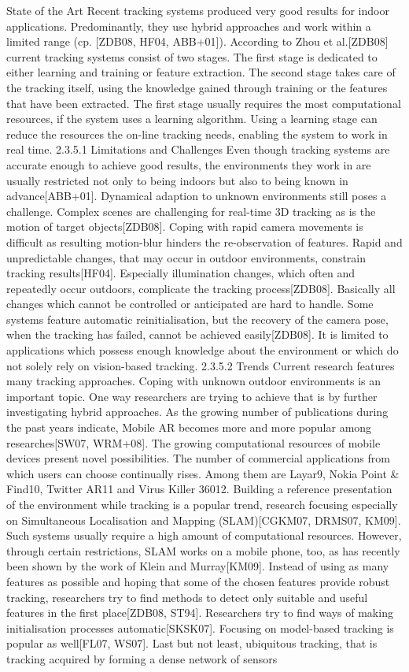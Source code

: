 State of the Art Recent tracking systems produced very good results for indoor applications. Predominantly, they use hybrid approaches and work within a limited range (cp. [ZDB08, HF04, ABB+01]). According to Zhou et al.[ZDB08] current tracking systems consist of two stages. The first stage is dedicated to either learning and training or feature extraction. The second stage takes care of the tracking itself, using the knowledge gained through training or the features that have been extracted. The first stage usually requires the most computational resources, if the system uses a learning algorithm. Using a learning stage can reduce the resources the on-line tracking needs, enabling the system to work in real time. 2.3.5.1 Limitations and Challenges Even though tracking systems are accurate enough to achieve good results, the environments they work in are usually restricted not only to being indoors but also to being known in advance[ABB+01]. Dynamical adaption to unknown environments still poses a challenge. Complex scenes are challenging for real-time 3D tracking as is the motion of target objects[ZDB08]. Coping with rapid camera movements is difficult as resulting motion-blur hinders the re-observation of features. Rapid and unpredictable changes, that may occur in outdoor environments, constrain tracking results[HF04]. Especially illumination changes, which often and repeatedly occur outdoors, complicate the tracking process[ZDB08]. Basically all changes which cannot be controlled or anticipated are hard to handle. Some systems feature automatic reinitialisation, but the recovery of the camera pose, when the tracking has failed, cannot be achieved easily[ZDB08]. It is limited to applications which possess enough knowledge about the environment or which do not solely rely on vision-based tracking. 2.3.5.2 Trends Current research features many tracking approaches. Coping with unknown outdoor environments is an important topic. One way researchers are trying to achieve that is by further investigating hybrid approaches. As the growing number of publications during the past years indicate, Mobile AR becomes more and more popular among researches[SW07, WRM+08]. The growing computational resources of mobile devices present novel possibilities. The number of commercial applications from which users can choose continually rises. Among them are Layar9, Nokia Point \& Find10, Twitter AR11 and Virus Killer 36012. Building a reference presentation of the environment while tracking is a popular trend, research focusing especially on Simultaneous Localisation and Mapping (SLAM)[CGKM07, DRMS07, KM09]. Such systems usually require a high amount of computational resources. However, through certain restrictions, SLAM works on a mobile phone, too, as has recently been shown by the work of Klein and Murray[KM09]. Instead of using as many features as possible and hoping that some of the chosen features provide robust tracking, researchers try to find methods to detect only suitable and useful features in the first place[ZDB08, ST94]. Researchers try to find ways of making initialisation processes automatic[SKSK07]. Focusing on model-based tracking is popular as well[FL07, WS07]. Last but not least, ubiquitous tracking, that is tracking acquired by forming a dense network of sensors 